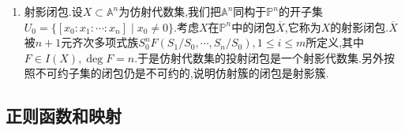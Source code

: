 \begin{enumerate}
\begin{enumerate}
\begin{proof}
    		另一方面任取$\mathbb{A}_k^n$中的闭子集$V=V(a)$,那么$\beta(a)$是一组$n+1$元齐次多项式,设它生成的$k[x_0,x_1,\cdots,x_n]$中的(齐次)理想是$b$,需要验证的是$\varphi^{-1}(V)=V_+(b)\cap U$.这个类似上一段最后部分的证明.
    	\end{proof}
    	\item 特别的,上一条中的同胚实际上是一个同构.它把$U_0$中开集上的局部正则函数$g(x_0,x_1,\cdots,x_n)/h(x_0,x_1,\cdots,x_n)$,其中$g$和$h$是次数相同的齐次多项式,对应为仿射情况的局部正则函数$g(1,y_1,\cdots,y_n)/h(1,y_1,\cdots,y_n)$.
    	\item 设$X$是射影代数簇,记$X_i=X\cap U_i$,它是$U_i\cong\mathbb{A}^n$中的闭子集:如果记$X$由齐次多项式$F_1,F_2,\cdots,F_m$定义的代数集,其中$F_i(X_0,X_1,\cdots,X_n)$是$n_i$次齐次多项式,那么$X_0$是被$X_0^{-n_i}F_i=F_i(1,T_1,T_2,\cdots,T_n)=0,1\le i\le m$定义的仿射代数集.这里把代数集改为代数簇也是成立的因为不可约空间的开子集仍然是不可约的.于是由于每个$X_i$都是仿射簇,得到$X$是预簇.另外这里$X_i$作为射影簇的开子集的截面环就是它作为仿射代数簇的坐标环$\mathbb{A}[X_i]\cong S(Y)_{(x_i)}$,这是局部化$S(Y)_{x_i}$自然的赋予分次结构后的零次子环.
    \end{enumerate}
    \item 射影闭包.设$X\subset\mathbb{A}^n$为仿射代数集,我们把$\mathbb{A}^n$同构于$\mathbb{P}^n$的开子集$U_0=\{[x_0:x_1:\cdots:x_n]\mid x_0\not=0\}$.考虑$X$在$\mathbb{P}^n$中的闭包$\overline{X}$,它称为$X$的射影闭包.$\overline{X}$被$n+1$元齐次多项式族$S_0^{n}F(S_1/S_0,\cdots,S_n/S_0),1\le i\le m$所定义,其中$F\in I(X),\deg F=n$.于是仿射代数集的投射闭包是一个射影代数集.另外按照不可约子集的闭包仍是不可约的,说明仿射簇的闭包是射影簇.
\end{enumerate}
\subsection{正则函数和映射}

